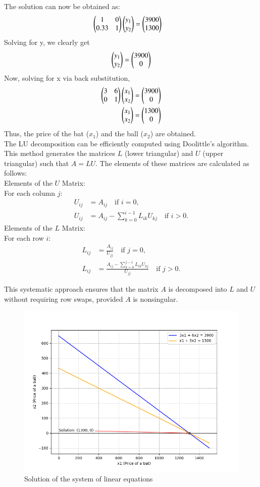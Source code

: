 \documentclass[journal]{IEEEtran}
\begin{document}
The solution can now be obtained as:
\begin{align}
	\begin{pmatrix}1&0\\0.33&1\end{pmatrix}\begin{pmatrix}y_1 \\ y_2\end{pmatrix} &= \begin{pmatrix}3900 \\ 1300\end{pmatrix}
\end{align}
Solving for y, we clearly get
\begin{align}
	\begin{pmatrix}y_1 \\ y_2\end{pmatrix} = \begin{pmatrix}3900 \\ 0\end{pmatrix}
\end{align}
Now, solving for x via back substitution, 
\begin{align}
	\begin{pmatrix}3&6\\0&1\end{pmatrix}\begin{pmatrix}x_1 \\ x_2\end{pmatrix} &= \begin{pmatrix}3900 \\ 0\end{pmatrix} \\
	\begin{pmatrix}x_1 \\ x_2\end{pmatrix} &= \begin{pmatrix}1300 \\ 0\end{pmatrix} 
\end{align}
Thus, the price of the bat ($x_1$) and the ball ($x_2$) are obtained.\\
The LU decomposition can be efficiently computed using Doolittle's algorithm. This method generates the matrices \( L \) (lower triangular) and \( U \) (upper triangular) such that \( A = LU \). The elements of these matrices are calculated as follows: \\
Elements of the \( U \) Matrix:  \\
For each column \( j \):
\begin{align}
	U_{ij} &= A_{ij} \quad \text{if } i = 0, \\
	U_{ij} &= A_{ij} - \sum_{k=0}^{i-1} L_{ik} U_{kj} \quad \text{if } i > 0.
\end{align}
Elements of the \( L \) Matrix: \\
For each row \( i \):
\begin{align}
	L_{ij} &= \frac{A_{ij}}{U_{jj}} \quad \text{if } j = 0, \\
	L_{ij} &= \frac{A_{ij} - \sum_{k=0}^{j-1} L_{ik} U_{kj}}{U_{jj}} \quad \text{if } j > 0.
\end{align}

This systematic approach ensures that the matrix \( A \) is decomposed into \( L \) and \( U \) without requiring row swaps, provided \( A \) is nonsingular.

	\begin{figure}[h!]
		\centering
		\includegraphics[width=\columnwidth]{figs/fig1.png}
		\caption{Solution of the system of linear equations}
		\label{stemplot}
	\end{figure}
	
\end{document}
